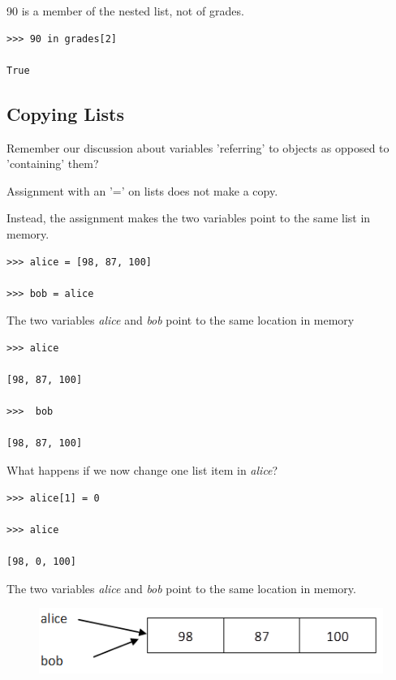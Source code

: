 \documentclass{article}
\begin{document}
90 is a member of the nested list, not of grades.

\begin{lstlisting}
>>> 90 in grades[2]

True
\end{lstlisting}

\subsection{Copying Lists}

Remember our discussion about variables 'referring' to objects as opposed to 'containing' them?

Assignment with an '=' on lists does not make a copy.

Instead, the assignment makes the two variables point to the same list in memory.

\begin{lstlisting}
>>> alice = [98, 87, 100]             

>>> bob = alice 

\end{lstlisting}

The two variables \textit{alice} and \textit{bob} point to the same location in memory

\begin{lstlisting}
>>> alice

[98, 87, 100]                     

>>>  bob

[98, 87, 100]

\end{lstlisting}

What happens if we now change one list item in \textit{alice}?

\begin{lstlisting}
>>> alice[1] = 0

>>> alice

[98, 0, 100]

\end{lstlisting}

The two variables \textit{alice} and \textit{bob} point to the same location in memory.\\

\begin{figure}[h]
\includegraphics[scale=.6]{alice_bob_same}\\
\end{figure}
\end{document}
